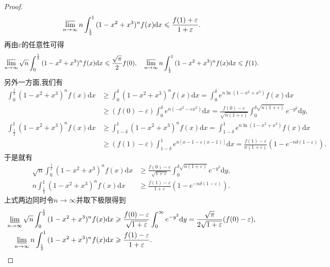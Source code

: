 \documentclass[../../main.tex]{subfiles}%
\begin{document}
\begin{proof}
\begin{gather*}
\varlimsup_{n\rightarrow\infty}n\int_{\frac{1}{2}}^1{(1 - x^2 + x^3)^nf(x)\mathrm{d}x}\leqslant \frac{f(1) + \varepsilon}{1 + \varepsilon}.
\end{gather*}
再由\(\varepsilon\)的任意性可得
\begin{align*}
\varlimsup_{n\rightarrow\infty}\sqrt{n}\int_0^{\frac{1}{2}}{(1 - x^2 + x^3)^nf(x)\mathrm{d}x}\leqslant \frac{\sqrt{\pi}}{2}f(0),\quad \varlimsup_{n\rightarrow\infty}n\int_{\frac{1}{2}}^1{(1 - x^2 + x^3)^nf(x)\mathrm{d}x}\leqslant f(1).
\end{align*}
另外一方面,我们有
\begin{align*}
\int_0^{\frac{1}{2}}{(1 - x^2 + x^3)^nf(x)\mathrm{d}x}&\geqslant \int_0^{\delta}{(1 - x^2 + x^3)^nf(x)\mathrm{d}x}=\int_0^{\delta}{e^{n\ln(1 - x^2 + x^3)}f(x)\mathrm{d}x}\\
&\geqslant (f(0) - \varepsilon)\int_0^{\delta}{e^{n(-x^2 - \varepsilon x^2)}\mathrm{d}x}=\frac{f(0) - \varepsilon}{\sqrt{n(1 + \varepsilon)}}\int_0^{\delta\sqrt{n(1 + \varepsilon)}}{e^{-y^2}\mathrm{d}y},
\end{align*}
\begin{align*}
\int_{\frac{1}{2}}^1{(1 - x^2 + x^3)^nf(x)\mathrm{d}x}&\geqslant \int_{1 - \delta}^1{(1 - x^2 + x^3)^nf(x)\mathrm{d}x}=\int_{1 - \delta}^1{e^{n\ln(1 - x^2 + x^3)}f(x)\mathrm{d}x}\\
&\geqslant (f(1) - \varepsilon)\int_{1 - \delta}^1{e^{n[x - 1 - \varepsilon(x - 1)]}\mathrm{d}x}=\frac{f(1) - \varepsilon}{n(1 + \varepsilon)}\left(1 - e^{-n\delta(1 - \varepsilon)}\right).
\end{align*}
于是就有
\begin{align*}
\sqrt{n}\int_0^{\frac{1}{2}}{(1 - x^2 + x^3)^nf(x)\mathrm{d}x}&\geqslant \frac{f(0) - \varepsilon}{\sqrt{1 + \varepsilon}}\int_0^{\delta\sqrt{n(1 + \varepsilon)}}{e^{-y^2}\mathrm{d}y},\\
n\int_{\frac{1}{2}}^1{(1 - x^2 + x^3)^nf(x)\mathrm{d}x}&\geqslant \frac{f(1) - \varepsilon}{1 + \varepsilon}\left(1 - e^{-n\delta(1 - \varepsilon)}\right).
\end{align*}
上式两边同时令\(n\rightarrow\infty\)并取下极限得到
\begin{align*}
\varliminf_{n\rightarrow\infty}\sqrt{n}\int_0^{\frac{1}{2}}{(1 - x^2 + x^3)^nf(x)\mathrm{d}x}&\geqslant \frac{f(0) - \varepsilon}{\sqrt{1 + \varepsilon}}\int_0^{\infty}{e^{-y^2}\mathrm{d}y}=\frac{\sqrt{\pi}}{2\sqrt{1 + \varepsilon}}(f(0) - \varepsilon),\\
\varliminf_{n\rightarrow\infty}n\int_{\frac{1}{2}}^1{(1 - x^2 + x^3)^nf(x)\mathrm{d}x}&\geqslant \frac{f(1) - \varepsilon}{1 + \varepsilon}.

\end{align*}
\end{proof}
\end{document}
